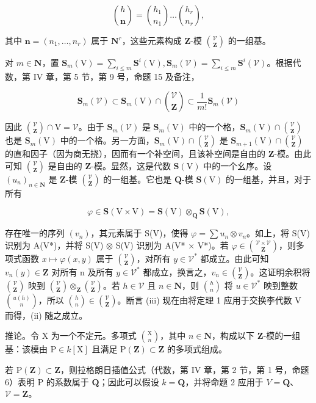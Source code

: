 \[
\binom{h}{\mathbf {n}} = \binom{h _ {1}}{n _ {1}} \dots \binom{h _ {r}}{n _ {r}},
\]

其中 \(\mathbf{n} = (n_1, \ldots, n_r)\) 属于 \(\mathbf{N}^r\)，这些元素构成 \(\mathbf{Z}\)-模 \(\binom{\mathcal{V}}{\mathbf{Z}}\) 的一组基。

对 \(m \in \mathbf{N}\)，置 \(\mathbf{S}_{m}(\mathrm{V}) = \sum_{i \leq m} \mathbf{S}^{i}(\mathrm{V}), \mathbf{S}_{m}(\mathcal{V}) = \sum_{i \leq m} \mathbf{S}^{i}(\mathcal{V})\)。根据代数，第 IV 章，第 5 节，第 9 号，命题 15 及备注，

\[
\mathbf {S} _ {m} (\mathcal {V}) \subset \mathbf {S} _ {m} (\mathrm{V}) \cap \binom{\mathcal {V}}{\mathbf {Z}} \subset \frac {1}{m !} \mathbf {S} _ {m} (\mathcal {V})
\]

因此 \(\binom{\mathcal{V}}{\mathbf{Z}}\cap\mathrm{V}=\mathcal{V}\)。由于 \(\mathbf{S}_{m}(\mathcal{V})\) 是 \(\mathbf{S}_{m}(\mathrm{V})\) 中的一个格，\(\mathbf{S}_{m}(\mathrm{V})\cap\binom{\mathcal{V}}{\mathbf{Z}}\) 也是 \(\mathbf{S}_{m}(\mathrm{V})\) 中的一个格。另一方面，\(\mathbf{S}_{m}(\mathrm{V})\cap\binom{\mathcal{V}}{\mathbf{Z}}\) 是 \(\mathbf{S}_{m+1}(\mathrm{V})\cap\binom{\mathcal{V}}{\mathbf{Z}}\) 的直和因子（因为商无挠），因而有一个补空间，且该补空间是自由的 \(\mathbf{Z}\)-模。由此可知 \(\binom{\mathcal{V}}{\mathbf{Z}}\) 是自由的 \(\mathbf{Z}\)-模。显然，这是代数 \(\mathbf{S}(\mathrm{V})\) 中的一个幺序。设 \((u_{n})_{n\in\mathbf{N}}\) 是 \(\mathbf{Z}\)-模 \(\binom{\mathcal{V}}{\mathbf{Z}}\) 的一组基。它也是 \(\mathbf{Q}\)-模 \(\mathbf{S}(\mathrm{V})\) 的一组基，并且，对于所有

\[
\varphi \in \mathbf {S} (\mathrm{V} \times \mathrm{V}) = \mathbf {S} (\mathrm{V}) \otimes_ {\mathbf {Q}} \mathbf {S} (\mathrm{V}),
\]

存在唯一的序列 \((v_{n})\)，其元素属于 S(V)，使得 \(\varphi=\sum u_{n}\otimes v_{n}\)。如上，将 S(V) 识别为 A(V*)，并将 S(V) \(\otimes\) S(V) 识别为 A(V* × V*)。若 \(\varphi\in\binom{\mathcal{V}\times\mathcal{V}}{\mathbf{Z}}\)，则多项式函数 \(x\mapsto\varphi(x,y)\) 属于 \(\binom{\mathcal{V}}{\mathbf{Z}}\)，对所有 \(y\in\mathcal{V}^{*}\) 都成立。由此可知 \(v_{n}(y)\in\mathbf{Z}\) 对所有 n 及所有 \(y\in\mathcal{V}^{*}\) 都成立，换言之，\(v_{n}\in\binom{\mathcal{V}}{\mathbf{Z}}\)。这证明余积将 \(\binom{\mathcal{V}}{\mathbf{Z}}\) 映到 \(\binom{\mathcal{V}}{\mathbf{Z}}\otimes_{\mathbf{Z}}\binom{\mathcal{V}}{\mathbf{Z}}\)。若 \(h\in\mathcal{V}\) 且 \(n\in\mathbf{N}\)，则 \(\binom{h}{n}\) 将 \(u\in\mathcal{V}^{*}\) 映到整数 \(\binom{u(h)}{n}\)，所以 \(\binom{h}{n}\in\binom{\mathcal{V}}{\mathbf{Z}}\)。断言 (iii) 现在由将定理 1 应用于交换李代数 V 而得，(ii) 随之成立。

推论。令 \(\mathrm{X}\) 为一个不定元。多项式 \(\binom{\mathrm{X}}{n}\)，其中 \(n \in \mathbf{N}\)，构成以下 \(\mathbf{Z}\)-模的一组基：该模由 \(\mathrm{P} \in k[\mathrm{X}]\) 且满足 \(\mathrm{P}(\mathbf{Z}) \subset \mathbf{Z}\) 的多项式组成。

若 \(\mathrm{P}(\mathbf{Z}) \subset \mathbf{Z}\)，则拉格朗日插值公式（代数，第 IV 章，第 2 节，第 1 号，命题 6）表明 P 的系数属于 \(\mathbf{Q}\)；因此可以假设 \(k = \mathbf{Q}\)，并将命题 2 应用于 \(V = \mathbf{Q}\)、\(\mathcal{V} = \mathbf{Z}\)。

